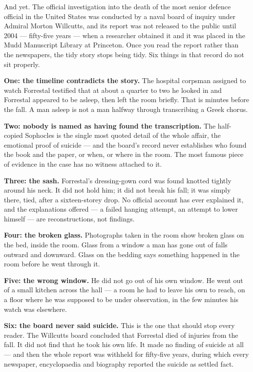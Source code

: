 And yet. The official investigation into the death of the most senior defence official in the
United States was conducted by a naval board of inquiry under Admiral Morton Willcutts, and its
report was not released to the public until 2004 --- fifty-five years --- when a researcher
obtained it and it was placed in the Mudd Manuscript Library at Princeton. Once you read the
report rather than the newspapers, the tidy story stops being tidy. Six things in that record do
not sit properly.

\textbf{One: the timeline contradicts the story.} The hospital corpsman assigned to watch
Forrestal testified that at about a quarter to two he looked in and Forrestal appeared to be
asleep, then left the room briefly. That is minutes before the fall. A man asleep is not a man
halfway through transcribing a Greek chorus.

\textbf{Two: nobody is named as having found the transcription.} The half-copied Sophocles is the
single most quoted detail of the whole affair, the emotional proof of suicide --- and the board's
record never establishes who found the book and the paper, or when, or where in the room. The
most famous piece of evidence in the case has no witness attached to it.

\textbf{Three: the sash.} Forrestal's dressing-gown cord was found knotted tightly around his
neck. It did not hold him; it did not break his fall; it was simply there, tied, after a
sixteen-storey drop. No official account has ever explained it, and the explanations offered ---
a failed hanging attempt, an attempt to lower himself --- are reconstructions, not findings.

\textbf{Four: the broken glass.} Photographs taken in the room show broken glass on the bed,
inside the room. Glass from a window a man has gone out of falls outward and downward. Glass on
the bedding says something happened in the room before he went through it.

\textbf{Five: the wrong window.} He did not go out of his own window. He went out of a small
kitchen across the hall --- a room he had to leave his own to reach, on a floor where he was
supposed to be under observation, in the few minutes his watch was elsewhere.

\textbf{Six: the board never said suicide.} This is the one that should stop every reader. The
Willcutts board concluded that Forrestal died of injuries from the fall. It did not find that he
took his own life. It made no finding of suicide at all --- and then the whole report was withheld
for fifty-five years, during which every newspaper, encyclopaedia and biography reported the
suicide as settled fact.

